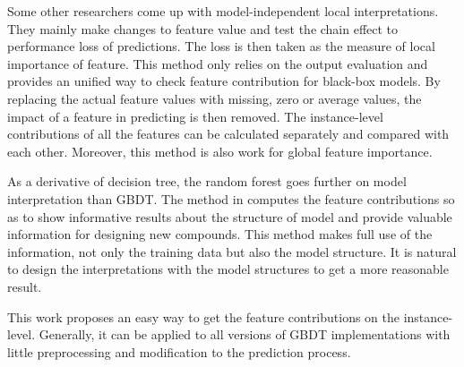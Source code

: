 Some other researchers come up with model-independent local interpretations. 
They mainly make changes to feature value and test the chain effect to 
performance loss of predictions.
The loss is then taken as the measure of local importance of 
feature\cite{lei2017distribution}. This method only relies
on the output evaluation and provides an unified way to check feature 
contribution for black-box models. 
By replacing the actual
feature values with missing, zero or average values, the impact of a feature in predicting is
then removed. The instance-level contributions of all the features can be calculated separately
and compared with each other. Moreover, this method is also work for global feature importance.

As a derivative of decision tree, the random forest goes further on model interpretation
than GBDT. The method in \cite{kuz2011interpretation,palczewska2013interpreting}
computes the feature contributions so as to show informative results
about the structure of model and provide valuable information for designing new compounds.
This method makes full use of the information, not only the training data
but also the model structure. It is natural to design the interpretations with the model
structures to get a more reasonable result.

This work 
proposes an easy way to get the feature contributions on 
the instance-level. 
Generally, it can be applied to all versions of GBDT implementations
with little preprocessing and modification to the prediction process.
